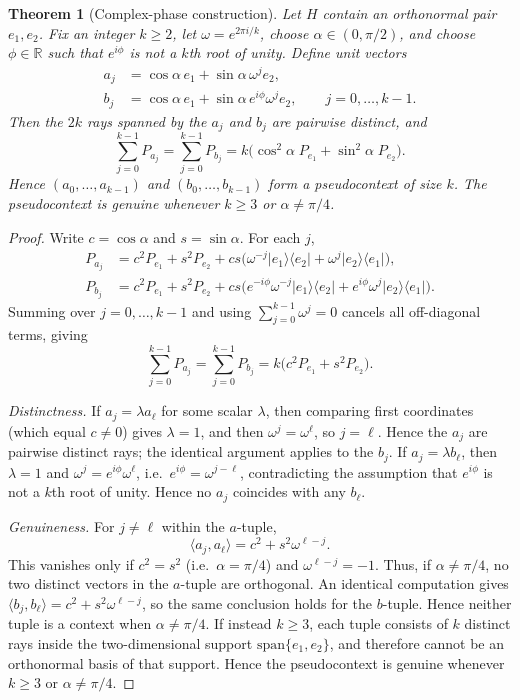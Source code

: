 \documentclass[
  twocolumn,
  aps,
  pra,
  floatfix,
  amsmath,amssymb,
  longbibliography
]{revtex4-2}
\newtheorem{theorem}{Theorem}
\theoremstyle{definition}
\theoremstyle{remark}
\begin{document}
\begin{theorem}[Complex-phase construction]\label{thm:allk}
Let $H$ contain an orthonormal pair $e_1,e_2$.  Fix an integer
$k\ge 2$, let $\omega=e^{2\pi i/k}$, choose $\alpha\in(0,\pi/2)$, and
choose $\phi\in\mathbb{R}$ such that $e^{i\phi}$ is not a $k$th root
of unity.  Define unit vectors
\begin{align*}
  a_j &= \cos\alpha\,e_1+\sin\alpha\,\omega^j e_2,\\
  b_j &= \cos\alpha\,e_1+\sin\alpha\,e^{i\phi}\omega^j e_2,
  \qquad j=0,\ldots,k-1.
\end{align*}
Then the $2k$ rays spanned by the $a_j$ and $b_j$ are pairwise
distinct, and
\[
  \sum_{j=0}^{k-1}P_{a_j}=\sum_{j=0}^{k-1}P_{b_j}
  =k\bigl(\cos^2\!\alpha\;P_{e_1}+\sin^2\!\alpha\;P_{e_2}\bigr).
\]
Hence $(a_0,\ldots,a_{k-1})$ and $(b_0,\ldots,b_{k-1})$ form a
pseudocontext of size $k$.  The pseudocontext is genuine whenever
$k\ge 3$ or $\alpha\neq\pi/4$.
\end{theorem}

\begin{proof}
Write $c=\cos\alpha$ and $s=\sin\alpha$.  For each $j$,
\begin{align*}
  P_{a_j} &= c^2 P_{e_1}+s^2 P_{e_2}
             +cs\bigl(\omega^{-j}|e_1\rangle\langle e_2|
                     +\omega^{j}|e_2\rangle\langle e_1|\bigr),\\
  P_{b_j} &= c^2 P_{e_1}+s^2 P_{e_2}
             +cs\bigl(e^{-i\phi}\omega^{-j}|e_1\rangle\langle e_2|
                     +e^{i\phi}\omega^{j}|e_2\rangle\langle e_1|\bigr).
\end{align*}
Summing over $j=0,\ldots,k-1$ and using $\sum_{j=0}^{k-1}\omega^j=0$
cancels all off-diagonal terms, giving
\[
  \sum_{j=0}^{k-1}P_{a_j}=\sum_{j=0}^{k-1}P_{b_j}
  =k\bigl(c^2 P_{e_1}+s^2 P_{e_2}\bigr).
\]

\textit{Distinctness.}
If $a_j=\lambda a_\ell$ for some scalar $\lambda$, then comparing
first coordinates (which equal $c\neq 0$) gives $\lambda=1$, and then
$\omega^j=\omega^\ell$, so $j=\ell$.  Hence the $a_j$ are pairwise
distinct rays; the identical argument applies to the $b_j$.  If
$a_j=\lambda b_\ell$, then $\lambda=1$ and
$\omega^j=e^{i\phi}\omega^\ell$, i.e.\ $e^{i\phi}=\omega^{j-\ell}$,
contradicting the assumption that $e^{i\phi}$ is not a $k$th root of
unity.  Hence no $a_j$ coincides with any $b_\ell$.

\textit{Genuineness.}
For $j\neq\ell$ within the $a$-tuple,
\[
  \langle a_j,a_\ell\rangle = c^2+s^2\omega^{\ell-j}.
\]
This vanishes only if $c^2=s^2$ (i.e.\ $\alpha=\pi/4$) and
$\omega^{\ell-j}=-1$.  Thus, if $\alpha\neq\pi/4$, no two distinct
vectors in the $a$-tuple are orthogonal.  An identical computation
gives $\langle b_j,b_\ell\rangle=c^2+s^2\omega^{\ell-j}$, so the same
conclusion holds for the $b$-tuple.  Hence neither tuple is a context
when $\alpha\neq\pi/4$.  If instead $k\ge 3$, each tuple consists of
$k$ distinct rays inside the two-dimensional support
$\mathrm{span}\{e_1,e_2\}$, and therefore cannot be an orthonormal
basis of that support.  Hence the pseudocontext is genuine whenever
$k\ge3$ or $\alpha\neq\pi/4$.
\end{proof}
\end{document}
